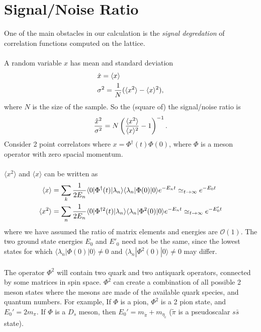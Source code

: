 \section{Signal/Noise Ratio}
\label{sec:signalnoise}

One of the main obstacles in our calculation is the \textit{signal degredation} of correlation functions computed on the lattice.
\\ \\
A random variable $x$ has mean and standard deviation
\begin{align}
	&\hat{x} = \langle x \rangle \\
	&\sigma^2 = {1\over N} ( \langle x^2 \rangle - \langle x \rangle^2 ),
\end{align}
where $N$ is the size of the sample. So the (square of) the signal/noise ratio is
\begin{align}
	{\hat{x}^2\over \sigma^2} = N \left( {\langle x^2 \rangle \over \langle x \rangle^2} - 1 \right) ^{-1}.
\end{align}
Consider 2 point correlators where $x = \Phi^{\dagger}(t) \Phi(0)$, where $\Phi$ is a meson operator with zero spacial momentum.
\\ \\
$\langle x^2 \rangle$ and $\langle x \rangle$ can be written as
\begin{align}
	\langle x \rangle &= \sum_k {1\over 2E_n} \langle 0 | \Phi^{\dagger}(t) | \lambda_n \rangle \langle \lambda_n | \Phi(0) | 0 \rangle e^{-E_n t} \simeq_{t\to\infty} e^{-E_0 t}\\
	\langle x^2 \rangle &= \sum_n {1\over 2E_n} \langle 0 | \Phi^{\dagger 2}(t) | \lambda_n \rangle \langle \lambda_n | \Phi^2(0) | 0 \rangle e^{-E_n t} \simeq_{t\to\infty} e^{-E'_0 t}
\end{align}
where we have assumed the ratio of matrix elements and energies are $\mathcal{O}(1)$. The two ground state energies $E_0$ and $E'_0$ need not be the same, since the lowest states for which 
$\langle \lambda_n | \Phi(0) | 0 \rangle \neq 0$ and $\langle \lambda_n | \Phi^2(0) | 0 \rangle \neq 0$ may differ. 
\\ \\
The operator $\Phi^2$ will contain two quark and two antiquark operators, connected by some matrices in spin space. $\Phi^2$ can create a combination of all possible 2 meson states where the mesons are made of the available quark species, and quantum numbers. For example, If $\Phi$ is a pion, $\Phi^2$ is a 2 pion state, and $E_0' = 2m_{\pi}$. If $\Phi$ is a $D_s$ meson, then $E_0' = m_{\tilde{\pi}} + m_{\eta_c}$ ($\tilde{\pi}$ is a pseudoscalar $s\bar{s}$ state).
